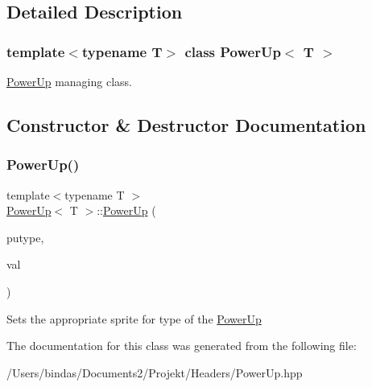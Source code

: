 \subsection{Detailed Description}
\subsubsection*{template$<$typename T$>$\newline
class Power\+Up$<$ T $>$}

\mbox{\hyperlink{class_power_up}{Power\+Up}} managing class. 

\subsection{Constructor \& Destructor Documentation}
\mbox{\label{class_power_up_a03f89f8ff81c7c7753d6df1907e668f2}} 
\subsubsection{\texorpdfstring{PowerUp()}{PowerUp()}}
{\footnotesize\ttfamily template$<$typename T $>$ \\
\mbox{\hyperlink{class_power_up}{Power\+Up}}$<$ T $>$\+::\mbox{\hyperlink{class_power_up}{Power\+Up}} (\begin{DoxyParamCaption}\item[{Block\+Type}]{putype,  }\item[{T}]{val }\end{DoxyParamCaption})\hspace{0.3cm}{\ttfamily [explicit]}}

Sets the appropriate sprite for type of the \mbox{\hyperlink{class_power_up}{Power\+Up}} 

The documentation for this class was generated from the following file\+:\begin{DoxyCompactItemize}
\item 
/\+Users/bindas/\+Documents2/\+Projekt/\+Headers/Power\+Up.\+hpp\end{DoxyCompactItemize}
